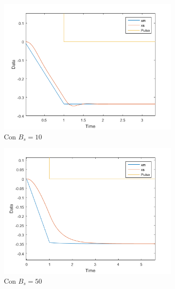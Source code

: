 \documentclass[a4paper, fontsize=11pt]{scrartcl} %
\numberwithin{equation}{section} %
\numberwithin{figure}{section} %
\numberwithin{table}{section} %
\begin{document}
	\begin{figure}[h!]
		\centering
		\begin{subfigure}[t]{.5\textwidth}
			\centering
			\includegraphics[width=1\linewidth]{images/Bs10.PNG}
			\caption{Con $B_s = 10$}
			\label{Bs10}
		\end{subfigure}%
		\begin{subfigure}[t]{.5\textwidth}
			\centering
			\includegraphics[width=1\linewidth]{images/Bs50.PNG}
			\caption{Con $B_s = 50$}
			\label{Bs30}
		\end{subfigure}
		\begin{subfigure}[t]{.5\textwidth}
			\centering

\end{subfigure}
\end{figure}
\end{document}
